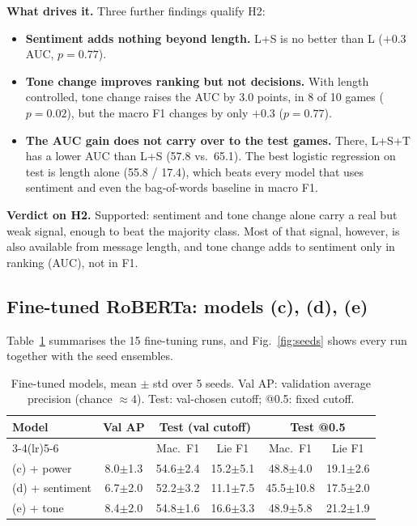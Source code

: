 \documentclass[conference]{IEEEtran}
\begin{document}
\textbf{What drives it.} Three further findings qualify H2:
\begin{itemize}
\item \textbf{Sentiment adds nothing beyond length.} L+S is no better than L ($+0.3$ AUC, $p = 0.77$).
\item \textbf{Tone change improves ranking but not decisions.} With length controlled, tone change raises the AUC by 3.0 points, in 8 of 10 games ($p = 0.02$), but the macro F1 changes by only $+0.3$ ($p = 0.77$).
\item \textbf{The AUC gain does not carry over to the test games.} There, L+S+T has a lower AUC than L+S (57.8 vs.\ 65.1). The best logistic regression on test is length alone (55.8 / 17.4), which beats every model that uses sentiment and even the bag-of-words baseline in macro F1.
\end{itemize}

\textbf{Verdict on H2.} Supported: sentiment and tone change alone carry a real but weak signal, enough to beat the majority class. Most of that signal, however, is also available from message length, and tone change adds to sentiment only in ranking (AUC), not in F1.

\subsection{Fine-tuned RoBERTa: models (c), (d), (e)}
\label{sec:res-ft}
Table~\ref{tab:ft} summarises the 15 fine-tuning runs, and Fig.~\ref{fig:seeds} shows every run together with the seed ensembles.

\begin{table}[t]
\centering
\caption{Fine-tuned models, mean $\pm$ std over 5 seeds. Val AP: validation average precision (chance $\approx 4$). Test: val-chosen cutoff; @0.5: fixed cutoff.}
\label{tab:ft}
\setlength{\tabcolsep}{2.5pt}
\begin{tabular}{lccccc}
\toprule
Model & Val AP & \multicolumn{2}{c}{Test (val cutoff)} & \multicolumn{2}{c}{Test @0.5} \\
\cmidrule(lr){3-4}\cmidrule(lr){5-6}
 & & Mac.\ F1 & Lie F1 & Mac.\ F1 & Lie F1 \\
\midrule
(c) + power     & 8.0$\pm$1.3 & 54.6$\pm$2.4 & 15.2$\pm$5.1 & 48.8$\pm$4.0 & 19.1$\pm$2.6 \\
(d) + sentiment & 6.7$\pm$2.0 & 52.2$\pm$3.2 & 11.1$\pm$7.5 & 45.5$\pm$10.8 & 17.5$\pm$2.0 \\
(e) + tone      & 8.4$\pm$2.0 & 54.8$\pm$1.6 & 16.6$\pm$3.3 & 48.9$\pm$5.8 & 21.2$\pm$1.9 \\
\bottomrule
\end{tabular}
\end{table}
\end{document}
